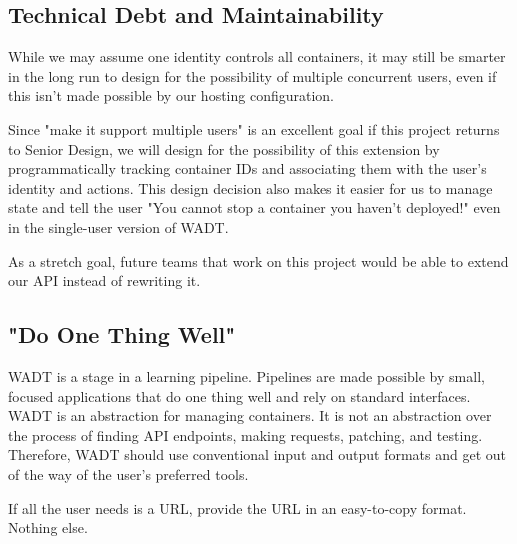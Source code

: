 \documentclass[12pt,titlepage]{article}
\begin{document}
\subsection{Technical Debt and Maintainability}
While we may assume one identity controls all containers, it may still be smarter in the long run to design for the possibility of multiple concurrent users, even if this isn't made possible by our hosting configuration.

Since "make it support multiple users" is an excellent goal if this project returns to Senior Design, we will design for the possibility of this extension by programmatically tracking container IDs and associating them with the user's identity and actions. This design decision also makes it easier for us to manage state and tell the user "You cannot stop a container you haven't deployed!" even in the single-user version of WADT.

As a stretch goal, future teams that work on this project would be able to extend our API instead of rewriting it.

\subsection{"Do One Thing Well"}
WADT is a stage in a learning pipeline. Pipelines are made possible by small, focused applications that do one thing well and rely on standard interfaces. WADT is an abstraction for managing containers. It is not an abstraction over the process of finding API endpoints, making requests, patching, and testing. Therefore, WADT should use conventional input and output formats and get out of the way of the user's preferred tools.

If all the user needs is a URL, provide the URL in an easy-to-copy format. Nothing else.
\end{document}
